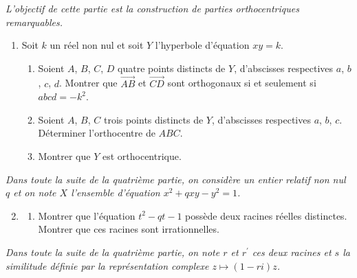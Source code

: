 \documentclass[landscape,twocolumn,leqno,a4paper,10pt]{report} %
\newcommand\n{\noindent}
\begin{document}
\n \textit{L'objectif de cette partie est la construction de parties orthocentriques remarquables.}

\begin{enumerate}
	\item Soit $k$ un réel non nul et soit $Y$ l'hyperbole d'équation $x y=k$.
	\begin{enumerate}
		\item Soient $A$, $B$, $C$, $D$ quatre points distincts de $Y$, d'abscisses respectives $a$, $b$, $c$, $d$. Montrer que $\overrightarrow{A B}$ et $\overrightarrow{C D}$ sont orthogonaux si et seulement si $a b c d=-k^{2}$.
		\item Soient $A$, $B$, $C$ trois points distincts de $Y$, d'abscisses respectives $a$, $b$, $c$. Déterminer l'orthocentre de $A B C$.
		\item Montrer que $Y$ est orthocentrique.
	\end{enumerate}
\end{enumerate}

\n \textit{Dans toute la suite de la quatrième partie, on considère un entier relatif non nul $q$ et on note $X$ l'ensemble d'équation $x^{2}+q x y-y^{2}=1$.}

\begin{enumerate}\setcounter{enumi}{1}
	\item \begin{enumerate}
		\item Montrer que l'équation $t^{2}-q t-1$ possède deux racines réelles distinctes. Montrer que ces racines sont irrationnelles.
	\end{enumerate}
\end{enumerate}

\n \textit{Dans toute la suite de la quatrième partie, on note $r$ et $r^{\prime}$ ces deux racines et $s$ la similitude définie par la représentation complexe $z \mapsto(1-r i) z$.}
\end{document}
